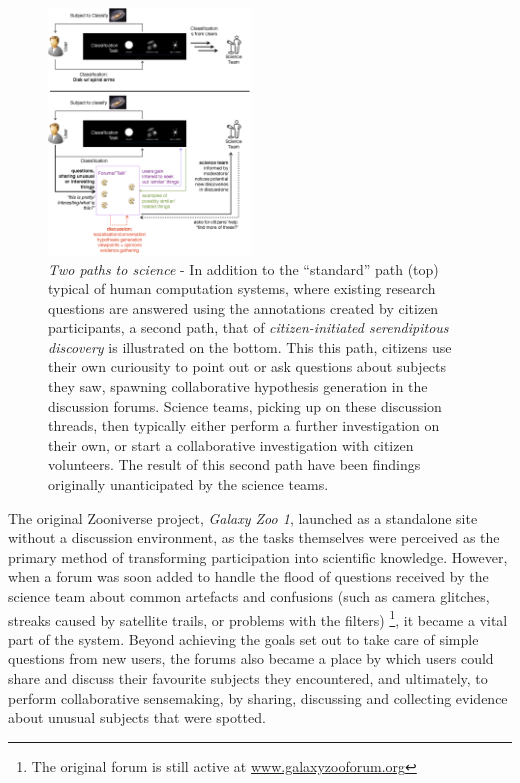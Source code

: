 \documentclass{sigchi}
\begin{document}
\begin{figure}
\centering
\includegraphics[width=0.48\textwidth]{imgs/twopaths.png}
\caption{\emph{Two paths to science} - In addition to the ``standard'' path (top) typical of human computation systems, where existing research questions are answered using the annotations created by citizen participants, a second path, that of \emph{citizen-initiated serendipitous discovery} is illustrated on the bottom.  This this path, citizens use their own curiousity to point out or ask questions about subjects they saw, spawning collaborative hypothesis generation in the discussion forums. Science teams, picking up on these discussion threads, then typically either perform a further investigation on their own, or start a collaborative investigation with citizen volunteers.  The result of this second path have been findings originally unanticipated by the science teams.}
\label{fig:twopaths}
\end{figure}

The original Zooniverse project, \emph{Galaxy Zoo 1}, launched as a standalone site without a discussion environment, as the tasks themselves were perceived as the primary method of transforming participation into scientific knowledge. However, when a forum was soon added to handle the flood of questions received by the science team about common artefacts and confusions (such as camera glitches, streaks caused by satellite trails, or problems with the filters) \footnote{The original forum is still active at \url{www.galaxyzooforum.org}}, it became a vital part of the system.  Beyond achieving the goals set out to take care of simple questions from new users, the forums also became a place by which users could share and discuss their favourite subjects they encountered, and ultimately, to perform collaborative sensemaking, by sharing, discussing and collecting evidence about unusual subjects that were spotted.  
\end{document}
